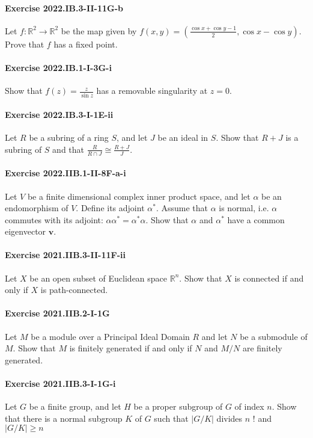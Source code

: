 \documentclass{article}
\begin{document}
\paragraph{Exercise 2022.IB.3-II-11G-b} Let $f: \mathbb{R}^{2} \rightarrow
\mathbb{R}^{2}$ be the map given by $f(x, y)=\left(\frac{\cos x+\cos y-1}{2},
\cos x-\cos y\right)$. Prove that $f$ has a fixed point.

\paragraph{Exercise 2022.IB.1-I-3G-i} Show that $f(z)=\frac{z}{\sin z}$ has a removable singularity at $z=0$.

\paragraph{Exercise 2022.IB.3-I-1E-ii} Let $R$ be a subring of a ring $S$, and let $J$ be an ideal in $S$. Show that $R+J$ is a subring of $S$ and that $\frac{R}{R \cap J} \cong \frac{R+J}{J}$.

\paragraph{Exercise 2022.IIB.1-II-8F-a-i} Let $V$ be a finite dimensional complex inner product space, and let $\alpha$ be an endomorphism of $V$. Define its adjoint $\alpha^*$. Assume that $\alpha$ is normal, i.e. $\alpha$ commutes with its adjoint: $\alpha \alpha^*=\alpha^* \alpha$. Show that $\alpha$ and $\alpha^*$ have a common eigenvector $\mathbf{v}$. 

\paragraph{Exercise 2021.IIB.3-II-11F-ii} Let $X$ be an open subset of Euclidean space $\mathbb{R}^n$. Show that $X$ is connected if and only if $X$ is path-connected.

\paragraph{Exercise 2021.IIB.2-I-1G} Let $M$ be a module over a Principal Ideal Domain $R$ and let $N$ be a submodule of $M$. Show that $M$ is finitely generated if and only if $N$ and $M / N$ are finitely generated.

\paragraph{Exercise 2021.IIB.3-I-1G-i} Let $G$ be a finite group, and let $H$ be a proper subgroup of $G$ of index $n$. Show that there is a normal subgroup $K$ of $G$ such that $|G / K|$ divides $n$ ! and $|G / K| \geqslant n$
\end{document}
